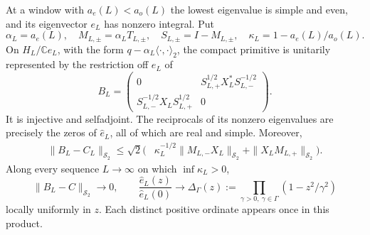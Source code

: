 \begin{proposition}\label{prop:parity-comparison}
At a window with $a_e(L)<a_o(L)$ the lowest eigenvalue is simple and
even, and its eigenvector $e_L$ has nonzero integral. Put
\[
 \alpha_L=a_e(L),\quad M_{L,\pm}=\alpha_LT_{L,\pm},\quad
 S_{L,\pm}=I-M_{L,\pm},\quad
 \kappa_L=1-a_e(L)/a_o(L).
\]
On $H_L/\mathbb Ce_L$, with the form
$q-\alpha_L\langle\cdot,\cdot\rangle_2$, the compact primitive is
unitarily represented by the restriction off $e_L$ of
\[
 B_L=\begin{pmatrix}
 0&S_{L,+}^{1/2}X_L^*S_{L,-}^{-1/2}\\
 S_{L,-}^{-1/2}X_LS_{L,+}^{1/2}&0
 \end{pmatrix}.
\]
It is injective and selfadjoint. The reciprocals of its nonzero
eigenvalues are precisely the zeros of $\widehat e_L$, all of which
are real and simple. Moreover,
\begin{align}
 \|B_L-C_L\|_{\mathcal S_2}
 \le\sqrt2\bigl(&\kappa_L^{-1/2}
       \|M_{L,-}X_L\|_{\mathcal S_2}
       +\|X_LM_{L,+}\|_{\mathcal S_2}\bigr).
 \label{eq:parity-error}
\end{align}
Along every sequence $L\to\infty$ on which $\inf\kappa_L>0$,
\[
 \|B_L-C\|_{\mathcal S_2}\longrightarrow0,\qquad
 \frac{\widehat e_L(z)}{\widehat e_L(0)}\longrightarrow
 \Delta_\Gamma(z):=\prod_{\gamma>0,\ \gamma\in\Gamma}
              (1-z^2/\gamma^2)
\]
locally uniformly in $z$. Each distinct positive ordinate appears once
in this product.
\end{proposition}

